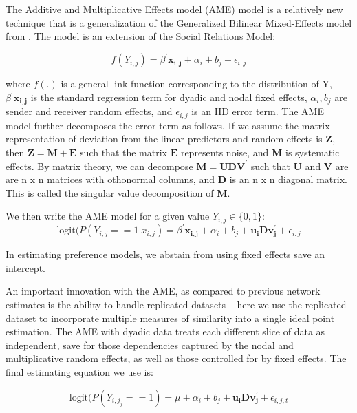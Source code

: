\documentclass[fignum,letterpaper,12pt]{amsart}
\begin{document}
The Additive and Multiplicative Effects model (AME) model is a relatively new technique that is a generalization of the Generalized Bilinear Mixed-Effects model from \citet{hoff:2005}. The model is an extension of the Social Relations Model: 

\begin{equation}
f(Y_{i,j}) =  \beta^{'}\mathbf{x_{i,j}} + \alpha_{i} + b_{j} + \epsilon_{i,j}
\end{equation}

where $f(.)$ is a general link function corresponding to the distribution of Y, $\beta^{'}\mathbf{x_{i,j}}$ is the standard regression term for dyadic and nodal fixed effects,  $\alpha_{i}, b_{j}$ are sender and receiver random effects, and $\epsilon_{i,j}$ is an IID error term. The AME model further decomposes the  error term as follows. If we assume the matrix representation of deviation from the linear predictors and random effects is $\mathbf{Z}$, then $\mathbf{Z} = \mathbf{M} + \mathbf{E}$ such that the matrix $\mathbf{E}$ represents noise, and $\mathbf{M}$ is systematic effects. By matrix theory, we can decompose $\mathbf{M} = \mathbf{UDV^{'}}$ such that $\mathbf{U}$ and $\mathbf{V}$ are are n x n matrices with othonormal columns, and $\mathbf{D}$ is an n x n diagonal matrix. This is called the singular value decomposition of $\mathbf{M}$. 

We then write the AME model for a given value $Y_{i,j} \in \{0,1\}$:
\begin{equation}
\text{logit}(P(Y_{i,j} == 1| x_{i,j}) = \beta^{'}\mathbf{x_{i,j}} + \alpha_{i} + b_{j} + \mathbf{u_{i}Dv^{'}_{j}} + \epsilon_{i,j}
\end{equation}

In estimating preference models, we abstain from using fixed effects save an intercept.

An important innovation with the AME, as compared to previous network estimates is the ability to handle replicated datasets -- here we use the replicated dataset to incorporate multiple measures of similarity into a single ideal point estimation.  The AME with dyadic data treats each different slice of data as independent, save for those dependencies captured by the nodal and multiplicative random effects, as well as those controlled for by fixed effects. The final estimating equation we use is:

\begin{equation}
\text{logit}(P(Y_{i,j_j} == 1) = \mu + \alpha_{i} + b_{j} + \mathbf{u_{i}Dv^{'}_{j}} + \epsilon_{i,j,t}
\end{equation}
\end{document}
